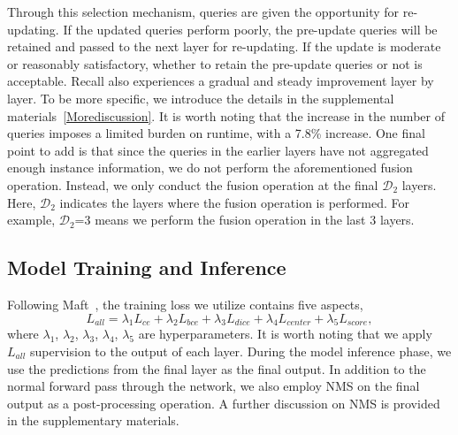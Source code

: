 Through this selection mechanism, queries are given the opportunity for re-updating. If the updated queries perform poorly, the pre-update queries will be retained and passed to the next layer for re-updating. If the update is moderate or reasonably satisfactory, whether to retain the pre-update queries or not is acceptable. Recall also experiences a gradual and steady improvement layer by layer. To be more specific, we introduce the details in the supplemental materials~\ref{Morediscussion}. It is worth noting that the increase in the number of queries imposes a limited burden on runtime, with a 7.8\% increase. One final point to add is that since the queries in the earlier layers have not aggregated enough instance information, we do not perform the aforementioned fusion operation. Instead, we only conduct the fusion operation at the final $\mathcal{D}_2$ layers.  Here, $\mathcal{D}_2$ indicates the layers where the fusion operation is performed. For example, 
$\mathcal{D}_2$=3 means we perform the fusion operation in the last 3 layers. 


\subsection{Model Training and Inference}
\label{training inference}
Following Maft~\cite{lai2023mask}, the training loss we utilize contains five aspects, 
\begin{equation}
  \label{lall}
  L_{all} = \lambda_1L_{ce} + \lambda_2L_{bce} + \lambda_3L_{dice}  + \lambda_4L_{center} + \lambda_5L_{score}, 
\end{equation}
where $\lambda_1$, $\lambda_2$, $\lambda_3$, $\lambda_4$, $\lambda_5$ are hyperparameters. It is worth noting that we apply $L_{all}$ supervision to the output of each layer.
During the model inference phase, we use the predictions from the final layer as the final output. In addition to the normal forward pass through the network, we also employ NMS on the final output as a post-processing operation. A further discussion on NMS is provided in the supplementary materials.